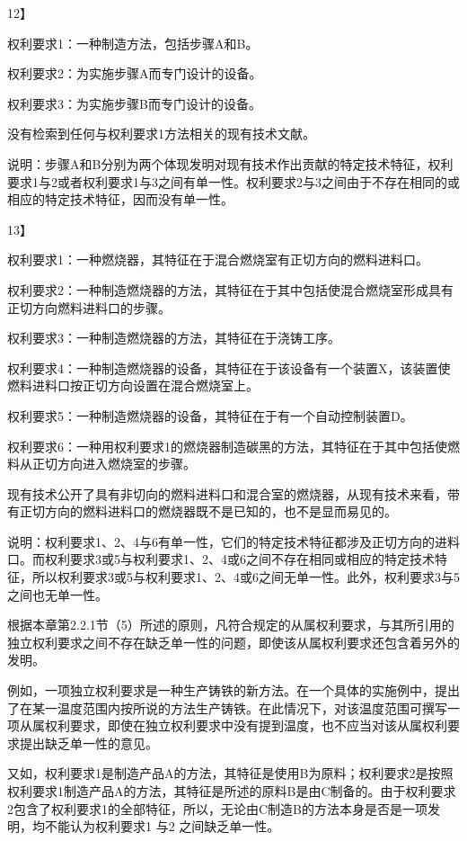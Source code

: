 {12{\kaiti 】}\par}

权利要求1：一种制造方法，包括步骤A和B。

权利要求2：为实施步骤A而专门设计的设备。

权利要求3：为实施步骤B而专门设计的设备。

没有检索到任何与权利要求1方法相关的现有技术文献。

说明：步骤A和B分别为两个体现发明对现有技术作出贡献的特定技术特征，权利要求1与2或者权利要求1与3之间有单一性。权利要求2与3之间由于不存在相同的或相应的特定技术特征，因而没有单一性。

{13{\kaiti 】}\par}

权利要求1：一种燃烧器，其特征在于混合燃烧室有正切方向的燃料进料口。

权利要求2：一种制造燃烧器的方法，其特征在于其中包括使混合燃烧室形成具有正切方向燃料进料口的步骤。

权利要求3：一种制造燃烧器的方法，其特征在于浇铸工序。

权利要求4：一种制造燃烧器的设备，其特征在于该设备有一个装置X，该装置使燃料进料口按正切方向设置在混合燃烧室上。

权利要求5：一种制造燃烧器的设备，其特征在于有一个自动控制装置D。

权利要求6：一种用权利要求1的燃烧器制造碳黑的方法，其特征在于其中包括使燃料从正切方向进入燃烧室的步骤。

现有技术公开了具有非切向的燃料进料口和混合室的燃烧器，从现有技术来看，带有正切方向的燃料进料口的燃烧器既不是已知的，也不是显而易见的。

说明：权利要求1、2、4与6有单一性，它们的特定技术特征都涉及正切方向的进料口。而权利要求3或5与权利要求1、2、4或6之间不存在相同或相应的特定技术特征，所以权利要求3或5与权利要求1、2、4或6之间无单一性。此外，权利要求3与5之间也无单一性。

根据本章第2.2.1节（5）所述的原则，凡符合规定的从属权利要求，与其所引用的独立权利要求之间不存在缺乏单一性的问题，即使该从属权利要求还包含着另外的发明。

例如，一项独立权利要求是一种生产铸铁的新方法。在一个具体的实施例中，提出了在某一温度范围内按所说的方法生产铸铁。在此情况下，对该温度范围可撰写一项从属权利要求，即使在独立权利要求中没有提到温度，也不应当对该从属权利要求提出缺乏单一性的意见。

又如，权利要求1是制造产品A的方法，其特征是使用B为原料；权利要求2是按照权利要求1制造产品A的方法，其特征是所述的原料B是由C制备的。由于权利要求2包含了权利要求1的全部特征，所以，无论由C制造B的方法本身是否是一项发明，均不能认为权利要求1 与2 之间缺乏单一性。

